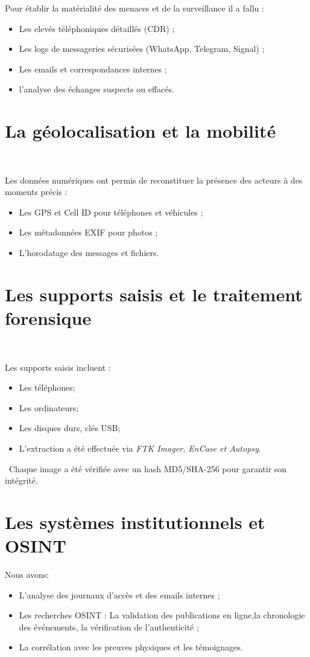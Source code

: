 \documentclass[12pt,a4paper]{report}
\begin{document}
Pour établir la matérialité des menaces et de la surveillance il a fallu : 
\begin{itemize}
    \item Les elevés téléphoniques détaillés (CDR) ;
    \item Les logs de messageries sécurisées (WhatsApp, Telegram, Signal) ;
    \item Les emails et correspondances internes ;
    \item l'analyse des échanges suspects ou effacés.
\end{itemize}

\section{La géolocalisation et la mobilité}\

Les données numériques ont permis de reconstituer la présence des acteurs à des moments précis : 
\begin{itemize}
    \item Les GPS et Cell ID pour téléphones et véhicules ;
    \item Les métadonnées EXIF pour photos ;
    \item L'horodatage des messages et fichiers.
\end{itemize}

\section{Les supports saisis et le traitement forensique}\

Les supports saisis incluent :
\begin{itemize}
 \item Les téléphones;
  \item Les ordinateurs; 
   \item Les disques durs, clés USB;  
 \item L’extraction a été effectuée via \textit{FTK Imager, EnCase et Autopsy}. 
 \end{itemize}\
Chaque image a été vérifiée avec un hash MD5/SHA-256 pour garantir son intégrité.

\section{Les systèmes institutionnels et OSINT}
Nous avons:
\begin{itemize}
    \item L'analyse des journaux d’accès et des emails internes ;
    \item Les recherches OSINT : La validation des publications en ligne,la  chronologie des événements, la vérification de l’authenticité ;
    \item La corrélation avec les preuves physiques et les témoignages.
\end{itemize}
\end{document}
